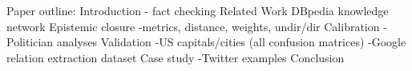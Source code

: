 Paper outline:
Introduction - fact checking
Related Work
DBpedia knowledge network
Epistemic closure
	-metrics, distance, weights, undir/dir
Calibration
	-Politician analyses
Validation
	-US capitals/cities (all confusion matrices)
	-Google relation extraction dataset
Case study
	-Twitter examples
Conclusion
